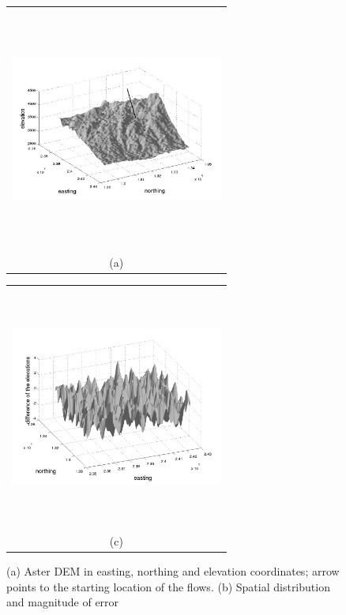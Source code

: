 \documentclass[a4paper,fleqn]{article}
\newcommand{\Pic}[2][0.85]{\begin{center}\texttt{[image: \#2]}
 \end{center} }
\begin{document}
\begin{figure}[H]
    \begin{minipage}[b]{0.6\textwidth}
        \begin{tabular}{c}
        \includegraphics[width=7cm,height=8cm,keepaspectratio]{xfig_rot.jpg}\\
        (a)
        \end{tabular}
    \end{minipage}
    \begin{minipage}{0.6\textwidth}
        \begin{tabular}{c}
        \includegraphics[width=7cm,height=8cm,keepaspectratio]{error3.jpg}\\
        (c)
        \end{tabular}
    \end{minipage} 	
\caption{(a) Aster DEM in easting, northing and elevation coordinates; arrow points to the starting location of the flows. (b) Spatial distribution and magnitude of error}
\label{fig1}  
\end{figure}
\end{document}
